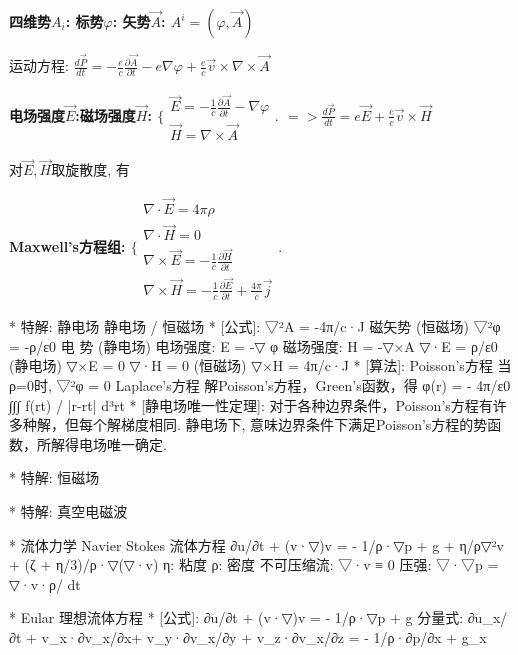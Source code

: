         \bf{四维势$A_{i}$: \quad 标势$\varphi$: \quad 矢势$\vec A$:}
            $A^{i}=(\varphi,\vec A)$
            
        运动方程:
            $\frac{d\vec P}{dt} = - \frac{e}{c} \frac{∂\vec A}{∂ t} - e \nabla \varphi + \frac{e}{c} \vec v \times \nabla \times \vec A$
            
        \bf{电场强度$\vec E$:\quad 磁场强度$\vec H$:}
            $
                \{ \begin{array}{ll}
                \vec E = -\frac{1}{c} \frac{∂ \vec A}{∂ t} - \nabla \varphi\\
                \vec H = \nabla \times \vec A
                \end{array} .
            $
            $ => \frac{d\vec P}{dt} = e \vec E + \frac{e}{c} \vec v \times \vec H$
            
        对$\vec E,\vec H$取旋散度, 有
        
        \bf{Maxwell's方程组}:
            $
                \{ \begin{array}{ll}
                \nabla \cdot \vec E = 4\pi\rho\\
                \nabla \cdot \vec H = 0\\
                \nabla \times \vec E = - \frac{1}{c} \frac{∂ \vec H}{∂ t}\\
                \nabla \times \vec H = - \frac{1}{c} \frac{∂ \vec E}{∂ t} + \frac{4\pi}{c}\vec j
                \end{array} .
            $


* 特解: 静电场
静电场  /  恒磁场
*	[公式]: 
		▽²A  = -4π/c·J		磁矢势 (恒磁场)
		▽²φ = -ρ/ε0			电  势 (静电场)
		电场强度: E = -▽ φ
		磁场强度: H = -▽×A
		▽·E = ρ/ε0			(静电场)
		▽×E = 0
		▽·H = 0				(恒磁场)
		▽×H = 4π/c·J
*	[算法]:	Poisson's方程		
		当ρ=0时, ▽²φ = 0		Laplace's方程
		解Poisson's方程，Green's函数，得 φ(r) = - 4π/ε0 ∫∫∫ f(rt) / |r-rt| d³rt
*	[静电场唯一性定理]:
		对于各种边界条件，Poisson's方程有许多种解，但每个解梯度相同.
		静电场下, 意味边界条件下满足Poisson's方程的势函数，所解得电场唯一确定.

* 特解: 恒磁场


* 特解: 真空电磁波



* 流体力学
    Navier Stokes 流体方程
    ∂\vec u/∂t + (\vec v·▽)\vec v =  - 1/ρ·▽p  + \vec g + η/ρ▽²\vec v + (ζ + η/3)/ρ·▽(▽·\vec v)
			η: 粘度    ρ: 密度
			不可压缩流: ▽·\vec v ≡ 0
			压强: ▽·▽p = ▽·v·ρ/ dt

*                   Eular 理想流体方程
*	[公式]: ∂\vec u/∂t + (\vec v·▽)\vec v = - 1/ρ·▽p + \vec g
		分量式:
			∂u_x/∂t + v_x·∂v_x/∂x+ v_y·∂v_x/∂y + v_z·∂v_x/∂z = - 1/ρ·∂p/∂x + g_x


